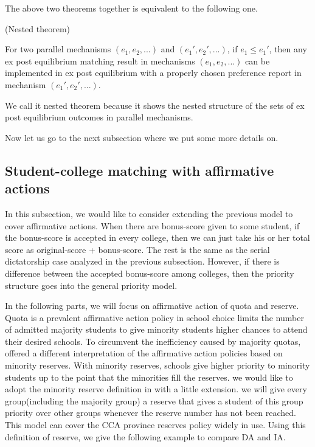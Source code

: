 The above two theorems together is equivalent to the following one.

\begin{thm}(Nested theorem)
  
For two parallel mechanisms $(e_1,e_2,...)$ and $(e_1',e_2',...)$, if $e_1 \leq e_1'$, then any ex post equilibrium matching result in mechanisms $(e_1,e_2,...)$ can be implemented in ex post equilibrium with a properly chosen preference report in mechanism $(e_1',e_2',...)$.
\end{thm}

We call it nested theorem because it shows  the nested structure of the sets of ex post equilibrium outcomes in parallel mechanisms.  

Now let us go to the next subsection where we put some more details on.

\subsection{Student-college matching with affirmative actions}

In this subsection, we would like to consider extending the previous
model to cover affirmative actions.
When there are bonus-score given to some student, if the bonus-score
is accepted in every college, then we can just take his or her total score as
original-score + bonus-score. The rest is the same as the serial
dictatorship case analyzed in the previous subsection. However, if
there is difference between the accepted bonus-score
among colleges, then the priority structure goes into the
general priority model.

In the following parts, we will focus on affirmative action of quota and reserve. Quota is 
a prevalent affirmative action policy in school choice limits the number of
admitted majority students to give minority students higher chances to attend their
desired schools. To circumvent the inefficiency caused by majority
quotas, \parencite{Hafalir2013} offered a different interpretation of the affirmative action policies based on
minority reserves. With minority reserves, schools give higher priority to
minority students up to the point that the minorities fill the reserves.
we would like to adopt the minority reserve definition
in \parencite{Hafalir2013} with a little extension. we will give every group(including the majority group) a reserve that gives a student of this group priority
over other groups whenever the reserve number has not been reached. This model can cover the CCA province reserves policy widely in use.
Using this definition of reserve, we give the following
example to compare DA and IA.

